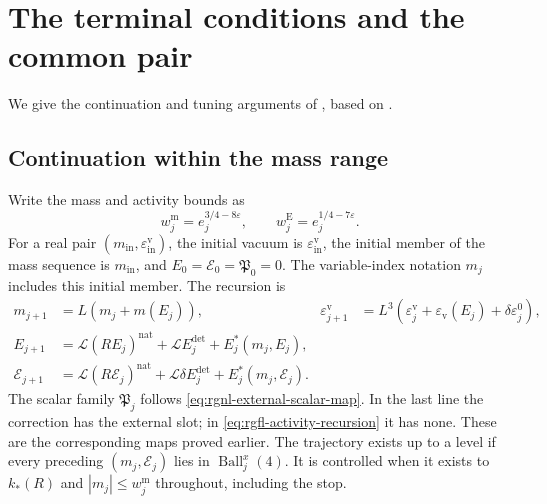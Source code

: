 \section{The terminal conditions and the common pair}\label{sec:common-tuning}

We give the continuation and tuning arguments of
\cite[\S\S16.2--16.4]{QED3Master}, based on
\cite[Chapter~28]{ChamberRG}.

\subsection{Continuation within the mass range}
\label{subsec:rgfl-continuation}

Write the mass and activity bounds as
\[
 w_j^{\mathrm m}=e_j^{3/4-8\varepsilon},\qquad
 w_j^{\mathrm E}=e_j^{1/4-7\varepsilon}.
\]
For a real pair $(m_{\mathrm{in}},\varepsilon_{\mathrm{in}}^{\mathrm v})$,
the initial vacuum is $\varepsilon_{\mathrm{in}}^{\mathrm v}$,
the initial member of the mass sequence is $m_{\mathrm{in}}$,
and $E_0=\mathscr E_0=\mathfrak P_0=0$.
The variable-index notation $m_j$ includes this initial member.
The recursion is
\begin{align}
 m_{j+1}&=L(m_j+m(E_j)),&
 \varepsilon_{j+1}^{\mathrm v}
       &=L^3(\varepsilon_j^{\mathrm v}
                 +\varepsilon_{\mathrm v}(E_j)+\delta\varepsilon_j^0),
                                      \label{eq:rgfl-coupling-recursion}\\
 E_{j+1}&=\mathcal L(RE_j)^{\mathrm{nat}}
                          +\mathcal LE_j^{\mathrm{det}}+E_j^*(m_j,E_j),
                                      \label{eq:rgfl-activity-recursion}\\
 \mathscr E_{j+1}
       &=\mathcal L(R\mathscr E_j)^{\mathrm{nat}}
               +\mathcal L\delta E_j^{\mathrm{det}}
                                      +E_j^*(m_j,\mathscr E_j).
                                      \label{eq:rgfl-slot-recursion}
\end{align}
The scalar family $\mathfrak P_j$ follows
\eqref{eq:rgnl-external-scalar-map}.
In the last line the correction has the external slot;
in \eqref{eq:rgfl-activity-recursion} it has none.
These are the corresponding maps proved earlier.
The trajectory exists up to a level if every preceding
$(m_j,\mathscr E_j)$ lies in $\operatorname{Ball}_j^x(4)$.
It is controlled when it exists to $k_*(R)$ and
$|m_j|\le w_j^{\mathrm m}$ throughout, including the stop.

